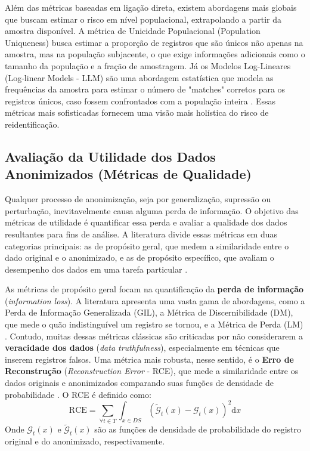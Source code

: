 Além das métricas baseadas em ligação direta, existem abordagens mais globais que buscam estimar o risco em nível populacional, extrapolando a partir da amostra disponível. A métrica de Unicidade Populacional (Population Uniqueness) busca estimar a proporção de registros que são únicos não apenas na amostra, mas na população subjacente, o que exige informações adicionais como o tamanho da população e a fração de amostragem. Já os Modelos Log-Lineares (Log-linear Models - LLM) são uma abordagem estatística que modela as frequências da amostra para estimar o número de "matches" corretos para os registros únicos, caso fossem confrontados com a população inteira \cite{Zuo2021Data}. Essas métricas mais sofisticadas fornecem uma visão mais holística do risco de reidentificação.

\subsection{Avaliação da Utilidade dos Dados Anonimizados (Métricas de Qualidade)}
\label{subsec:fund-metricas-utilidade}

Qualquer processo de anonimização, seja por generalização, supressão ou perturbação, inevitavelmente causa alguma perda de informação. O objetivo das métricas de utilidade é quantificar essa perda e avaliar a qualidade dos dados resultantes para fins de análise. A literatura divide essas métricas em duas categorias principais: as de propósito geral, que medem a similaridade entre o dado original e o anonimizado, e as de propósito específico, que avaliam o desempenho dos dados em uma tarefa particular \cite{Ferrao2022}.

As métricas de propósito geral focam na quantificação da \textbf{perda de informação} (\textit{information loss}). A literatura apresenta uma vasta gama de abordagens, como a Perda de Informação Generalizada (GIL), a Métrica de Discernibilidade (DM), que mede o quão indistinguível um registro se tornou, e a Métrica de Perda (LM) \cite{Zuo2021Data, Lee2017}. Contudo, muitas dessas métricas clássicas são criticadas por não considerarem a \textbf{veracidade dos dados} (\textit{data truthfulness}), especialmente em técnicas que inserem registros falsos. Uma métrica mais robusta, nesse sentido, é o \textbf{Erro de Reconstrução} (\textit{Reconstruction Error} - RCE), que mede a similaridade entre os dados originais e anonimizados comparando suas funções de densidade de probabilidade \cite{Lee2017}. O RCE é definido como:
$$ \text{RCE} = \sum_{\forall t \in T} \int_{x \in DS} (\tilde{\mathcal{G}}_{t}(x)-\mathcal{G}_{t}(x))^{2} \mathrm{d} x $$
Onde $\mathcal{G}_{t}(x)$ e $\tilde{\mathcal{G}}_{t}(x)$ são as funções de densidade de probabilidade do registro original e do anonimizado, respectivamente.

